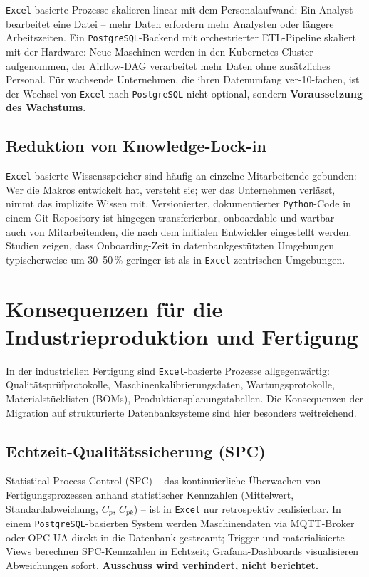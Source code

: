 \documentclass[12pt,a4paper]{report}
\theoremstyle{definition}
\theoremstyle{remark}
\newcommand{\excel}{\texttt{Excel}}
\newcommand{\pg}{\texttt{PostgreSQL}}
\newcommand{\py}{\texttt{Python}}
\begin{document}
\excel-basierte Prozesse skalieren linear mit dem Personalaufwand:
Ein Analyst bearbeitet eine Datei -- mehr Daten erfordern mehr
Analysten oder längere Arbeitszeiten.
Ein \pg-Backend mit orchestrierter ETL-Pipeline skaliert mit der
Hardware: Neue Maschinen werden in den Kubernetes-Cluster aufgenommen,
der Airflow-DAG verarbeitet mehr Daten ohne zusätzliches Personal.
Für wachsende Unternehmen, die ihren Datenumfang ver-10-fachen, ist
der Wechsel von \excel{} nach \pg{} nicht optional, sondern
\textbf{Voraussetzung des Wachstums}.

\subsection{Reduktion von Knowledge-Lock-in}

\excel-basierte Wissensspeicher sind häufig an einzelne Mitarbeitende
gebunden: Wer die Makros entwickelt hat, versteht sie; wer das
Unternehmen verlässt, nimmt das implizite Wissen mit.
Versionierter, dokumentierter \py-Code in einem Git-Repository ist
hingegen transferierbar, onboardable und wartbar -- auch von
Mitarbeitenden, die nach dem initialen Entwickler eingestellt werden.
Studien zeigen, dass Onboarding-Zeit in datenbankgestützten
Umgebungen typischerweise um 30--50\,\% geringer ist als in
\excel-zentrischen Umgebungen.

\section{Konsequenzen für die Industrieproduktion und Fertigung}

In der industriellen Fertigung sind \excel-basierte Prozesse
allgegenwärtig: Qualitätsprüfprotokolle, Maschinenkalibrierungsdaten,
Wartungsprotokolle, Materialstücklisten (BOMs),
Produktionsplanungstabellen.
Die Konsequenzen der Migration auf strukturierte Datenbanksysteme
sind hier besonders weitreichend.

\subsection{Echtzeit-Qualitätssicherung (SPC)}

Statistical Process Control (SPC) -- das kontinuierliche Überwachen
von Fertigungsprozessen anhand statistischer Kennzahlen (Mittelwert,
Standardabweichung, $C_p$, $C_{pk}$) -- ist in \excel{} nur
retrospektiv realisierbar.
In einem \pg-basierten System werden Maschinendaten via MQTT-Broker
oder OPC-UA direkt in die Datenbank gestreamt; Trigger und
materialisierte Views berechnen SPC-Kennzahlen in Echtzeit;
Grafana-Dashboards visualisieren Abweichungen sofort.
\textbf{Ausschuss wird verhindert, nicht berichtet.}
\end{document}
